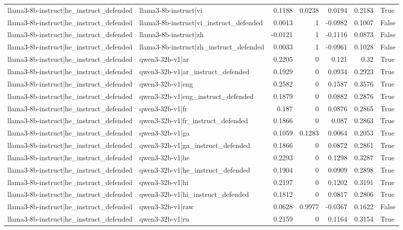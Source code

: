 \begin{table}
\begin{tabular}{l l r r r r l}
llama3-8b-instruct|he_instruct_defended & llama3-8b-instruct|vi & 0.1188 & 0.0238 & 0.0194 & 0.2183 & True \\
llama3-8b-instruct|he_instruct_defended & llama3-8b-instruct|vi_instruct_defended & 0.0013 & 1 & -0.0982 & 0.1007 & False \\
llama3-8b-instruct|he_instruct_defended & llama3-8b-instruct|zh & -0.0121 & 1 & -0.1116 & 0.0873 & False \\
llama3-8b-instruct|he_instruct_defended & llama3-8b-instruct|zh_instruct_defended & 0.0033 & 1 & -0.0961 & 0.1028 & False \\
llama3-8b-instruct|he_instruct_defended & qwen3-32b-v1|ar & 0.2205 & 0 & 0.121 & 0.32 & True \\
llama3-8b-instruct|he_instruct_defended & qwen3-32b-v1|ar_instruct_defended & 0.1929 & 0 & 0.0934 & 0.2923 & True \\
llama3-8b-instruct|he_instruct_defended & qwen3-32b-v1|eng & 0.2582 & 0 & 0.1587 & 0.3576 & True \\
llama3-8b-instruct|he_instruct_defended & qwen3-32b-v1|eng_instruct_defended & 0.1879 & 0 & 0.0882 & 0.2876 & True \\
llama3-8b-instruct|he_instruct_defended & qwen3-32b-v1|fr & 0.187 & 0 & 0.0876 & 0.2865 & True \\
llama3-8b-instruct|he_instruct_defended & qwen3-32b-v1|fr_instruct_defended & 0.1866 & 0 & 0.087 & 0.2863 & True \\
llama3-8b-instruct|he_instruct_defended & qwen3-32b-v1|ga & 0.1059 & 0.1283 & 0.0064 & 0.2053 & True \\
llama3-8b-instruct|he_instruct_defended & qwen3-32b-v1|ga_instruct_defended & 0.1866 & 0 & 0.0872 & 0.2861 & True \\
llama3-8b-instruct|he_instruct_defended & qwen3-32b-v1|he & 0.2293 & 0 & 0.1298 & 0.3287 & True \\
llama3-8b-instruct|he_instruct_defended & qwen3-32b-v1|he_instruct_defended & 0.1904 & 0 & 0.0909 & 0.2898 & True \\
llama3-8b-instruct|he_instruct_defended & qwen3-32b-v1|hi & 0.2197 & 0 & 0.1202 & 0.3191 & True \\
llama3-8b-instruct|he_instruct_defended & qwen3-32b-v1|hi_instruct_defended & 0.1812 & 0 & 0.0817 & 0.2806 & True \\
llama3-8b-instruct|he_instruct_defended & qwen3-32b-v1|raw & 0.0628 & 0.9977 & -0.0367 & 0.1622 & False \\
llama3-8b-instruct|he_instruct_defended & qwen3-32b-v1|ru & 0.2159 & 0 & 0.1164 & 0.3154 & True \\

\end{tabular}
\end{table}
